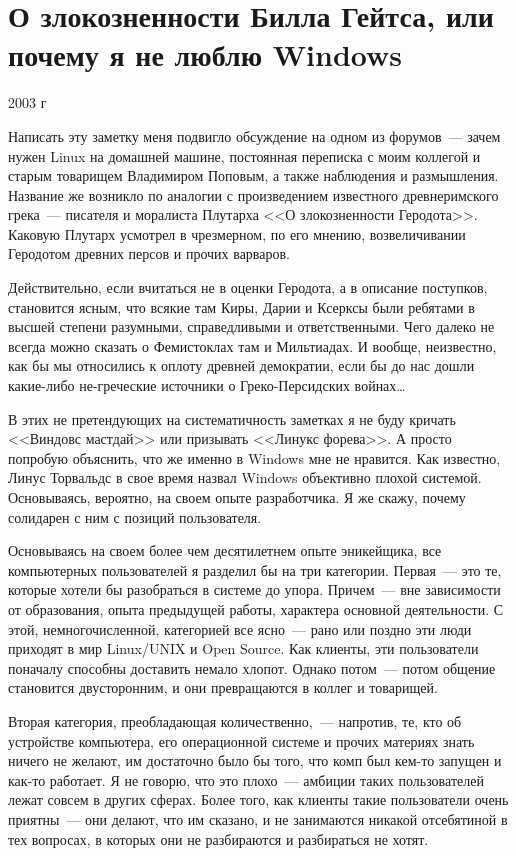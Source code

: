 \section{О злокозненности Билла Гейтса, или почему я не люблю Windows} 
\begin{timeline}2003 г\end{timeline}
Написать эту заметку меня подвигло обсуждение на одном из форумов~--- зачем нужен Linux на домашней машине, постоянная переписка с моим коллегой и старым товарищем Владимиром Поповым, а также наблюдения и размышления. Название же возникло по аналогии с произведением известного древнеримского грека~--- писателя и моралиста Плутарха <<О злокозненности Геродота>>. Каковую Плутарх усмотрел в чрезмерном, по его мнению, возвеличивании Геродотом древних персов и прочих варваров.

Действительно, если вчитаться не в оценки Геродота, а в описание поступков, становится ясным, что всякие там Киры, Дарии и Ксерксы были ребятами в высшей степени разумными, справедливыми и ответственными. Чего далеко не всегда можно сказать о Фемистоклах там и Мильтиадах. И вообще, неизвестно, как бы мы относились к оплоту древней демократии, если бы до нас дошли какие-либо не-греческие источники о Греко-Персидских войнах\dots 

В этих не претендующих на систематичность заметках я не буду кричать <<Виндовс мастдай>> или призывать <<Линукс форева>>. А просто попробую объяснить, что же именно в Windows мне не нравится. Как известно, Линус Торвальдс в свое время назвал Windows объективно плохой системой. Основываясь, вероятно, на своем опыте разработчика. Я же скажу, почему солидарен с ним с позиций пользователя. 

Основываясь на своем более чем десятилетнем опыте эникейщика, все компьютерных пользователей я разделил бы на три категории. Первая~--- это те, которые хотели бы разобраться в системе до упора. Причем~--- вне зависимости от образования, опыта предыдущей работы, характера основной деятельности. С этой, немногочисленной, категорией все ясно~--- рано или поздно эти люди приходят в мир Linux/UNIX и Open Source. Как клиенты, эти пользователи поначалу способны доставить немало хлопот. Однако потом~--- потом общение становится двусторонним, и они превращаются в коллег и товарищей. 

Вторая категория, преобладающая количественно,~--- напротив, те, кто об устройстве компьютера, его операционной системе и прочих материях знать ничего не желают, им достаточно было бы того, что комп был кем-то запущен и как-то работает. Я не говорю, что это плохо~--- амбиции таких пользователей лежат совсем в других сферах. Более того, как клиенты такие пользователи очень приятны~--- они делают, что им сказано, и не занимаются никакой отсебятиной в тех вопросах, в которых они не разбираются и разбираться не хотят. 

